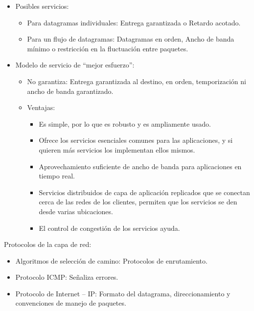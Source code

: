 \documentclass[12pt, twoside, openright]{report} %
\begin{document}
\begin{itemize}
	\item Posibles servicios:

	      \begin{itemize}
		      \item Para datagramas individuales: Entrega garantizada o Retardo
		            acotado.
		      \item Para un flujo de datagramas: Datagramas en orden, Ancho de banda
		            mínimo o restricción en la fluctuación entre paquetes.
	      \end{itemize}
	\item Modelo de servicio de \enquote{mejor esfuerzo}:

	      \begin{itemize}
		      \item No garantiza: Entrega garantizada al destino, en orden,
		            temporización ni ancho de banda garantizado.
		      \item Ventajas:

		            \begin{itemize}
			            \item Es simple, por lo que es robusto y es ampliamente usado.
			            \item Ofrece los servicios esenciales comunes para las aplicaciones,
			                  y si quieren más servicios los implementan ellos mismos.
			            \item Aprovechamiento suficiente de ancho de banda para aplicaciones
			                  en tiempo real.
			            \item Servicios distribuidos de capa de aplicación replicados que se
			                  conectan cerca de las redes de los clientes, permiten que los
			                  servicios se den desde varias ubicaciones.
			            \item El control de congestión de los servicios ayuda.
		            \end{itemize}
	      \end{itemize}
\end{itemize}

Protocolos de la capa de red:

\begin{itemize}
	\item Algoritmos de selección de camino: Protocolos de enrutamiento.
	\item Protocolo ICMP: Señaliza errores.
	\item Protocolo de Internet -- IP: Formato del datagrama,
	      direccionamiento y convenciones de manejo de paquetes.
\end{itemize}
\end{document}
